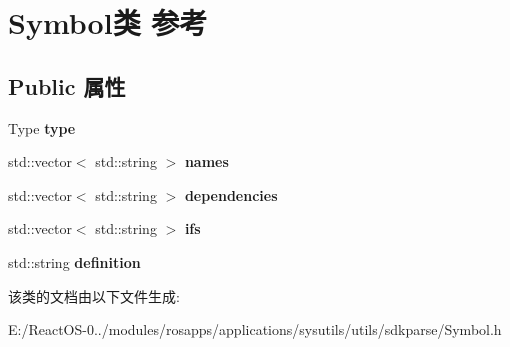 \hypertarget{class_symbol}{}\section{Symbol类 参考}
\label{class_symbol}
\subsection*{Public 属性}
\begin{DoxyCompactItemize}
\item 
\mbox{\label{class_symbol_acb03a33499910a73d719c1eedf22e5bb}} 
Type {\bfseries type}
\item 
\mbox{\label{class_symbol_a3f6cee9c2fadb0de7e413734673ecd0b}} 
std\+::vector$<$ std\+::string $>$ {\bfseries names}
\item 
\mbox{\label{class_symbol_af14a838ab19330cd9f6d42be23dec62f}} 
std\+::vector$<$ std\+::string $>$ {\bfseries dependencies}
\item 
\mbox{\label{class_symbol_a3833c1e8ca13ba818d24e665ae945466}} 
std\+::vector$<$ std\+::string $>$ {\bfseries ifs}
\item 
\mbox{\label{class_symbol_a1f27f6279a18864b9606efe2577e3c5b}} 
std\+::string {\bfseries definition}
\end{DoxyCompactItemize}


该类的文档由以下文件生成\+:\begin{DoxyCompactItemize}
\item 
E\+:/\+React\+O\+S-\/0../modules/rosapps/applications/sysutils/utils/sdkparse/Symbol.\+h\end{DoxyCompactItemize}
